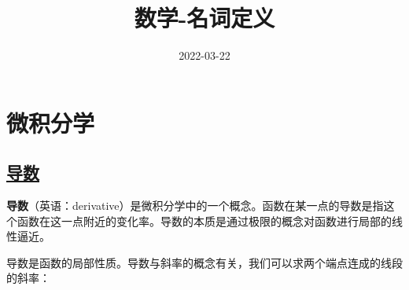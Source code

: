 

\title{数学-名词定义}
\date{2022-03-22}


\maketitle

\section{微积分学}

\subsection{\href{https://zh.wikipedia.org/wiki/\%E5\%AF\%BC\%E6\%95\%B0}{导数}}
\textbf{导数}（英语：derivative）是微积分学中的一个概念。函数在某一点的导数是指这个函数在这一点附近的变化率。导数的本质是通过极限的概念对函数进行局部的线性逼近。

导数是函数的局部性质。导数与斜率的概念有关，我们可以求两个端点连成的线段的斜率：


